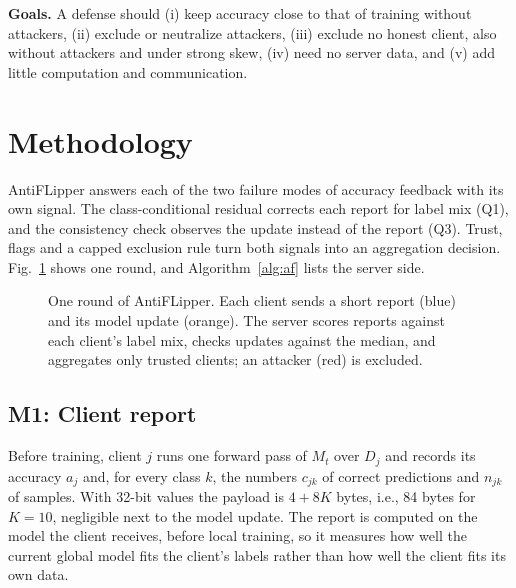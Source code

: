 \documentclass[journal]{IEEEtran}
\begin{document}
\textbf{Goals.} A defense should (i) keep accuracy close to that of training without attackers, (ii) exclude or neutralize attackers, (iii) exclude no honest client, also without attackers and under strong skew, (iv) need no server data, and (v) add little computation and communication.

\section{Methodology}
\label{sec:design}
AntiFLipper answers each of the two failure modes of accuracy feedback with its own signal. The class-conditional residual corrects each report for label mix (Q1), and the consistency check observes the update instead of the report (Q3). Trust, flags and a capped exclusion rule turn both signals into an aggregation decision. Fig.~\ref{fig:arch} shows one round, and Algorithm~\ref{alg:af} lists the server side.

\begin{figure}[t]
\centering
\resizebox{\columnwidth}{!}{}
\caption{One round of AntiFLipper. Each client sends a short report (blue) and its model update (orange). The server scores reports against each client's label mix, checks updates against the median, and aggregates only trusted clients; an attacker (red) is excluded.}
\label{fig:arch}
\end{figure}

\subsection{M1: Client report}
Before training, client $j$ runs one forward pass of $M_t$ over $D_j$ and records its accuracy $a_j$ and, for every class $k$, the numbers $c_{jk}$ of correct predictions and $n_{jk}$ of samples. With 32-bit values the payload is $4+8K$ bytes, i.e., 84 bytes for $K{=}10$, negligible next to the model update. The report is computed on the model the client receives, before local training, so it measures how well the current global model fits the client's labels rather than how well the client fits its own data.
\end{document}
